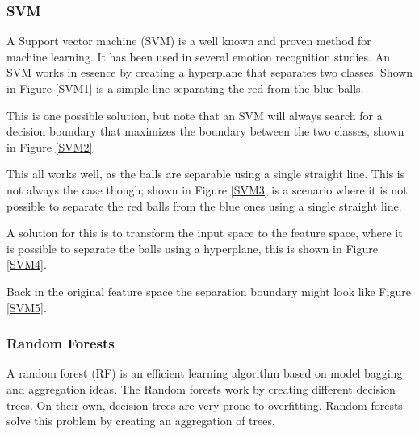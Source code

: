 \subsubsection{SVM}

A Support vector machine (SVM) is a well known and proven method for machine learning. It has been used in several emotion recognition studies. An SVM works in essence by creating a hyperplane that separates two classes. Shown in Figure \ref{SVM1} is a simple line separating the red from the blue balls.


This is one possible solution, but note that an SVM will always search for a decision boundary that maximizes the boundary between the two classes, shown in Figure \ref{SVM2}.


This all works well, as the balls are separable using a single straight line. This is not always the case though; shown in Figure \ref{SVM3} is a scenario where it is not possible to separate the red balls from the blue ones using a single straight line.


A solution for this is to transform the input space to the feature space, where it is possible to separate the balls using a hyperplane, this is shown in Figure \ref{SVM4}.


Back in the original feature space the separation boundary might look like Figure \ref{SVM5}.


\subsubsection{Random Forests}
A random forest (RF)  is an efficient learning algorithm based on model bagging and aggregation ideas\citep{rfPaper}. The Random forests work by creating different decision trees. On their own, decision trees are very prone to overfitting. Random forests solve this problem by creating an aggregation of trees. 

